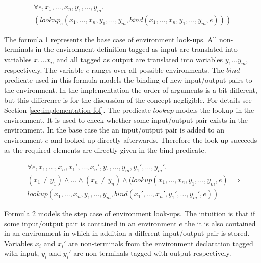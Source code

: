 \begin{figure}
\label{formula:environment-base}
\begin{multline}
  \forall e, x_1, \dots, x_n, y_1, \dots, y_m . \\
  (lookup_e(x_1,\dots,x_n,y_1,\dots,y_m,
  bind(x_1,\dots,x_n,y_1,\dots,y_m,e)))
\end{multline}
\end{figure}

The formula \ref{formula:environment-base} represents the base case of
environment look-ups. All non-terminals in the environment definition
tagged as input are translated into variables $x_1 \dots x_n$ and all
tagged as output are translated into variables $y_1 \dots y_m$,
respectively. The variable $e$ ranges over all possible
environments. The $bind$ predicate used in this formula models the
binding of new input/output pairs to the environment. In the
implementation the order of arguments is a bit different, but this
difference is for the discussion of the concept negligible. For
details see Section \ref{sec:implementation-fof}. The predicate
$lookup$ models the lookup in the environment. It is used to check
whether some input/output pair exists in the environment. In the base
case the an input/output pair is added to an environment $e$ and
looked-up directly afterwards. Therefore the look-up succeeds as the
required elements are directly given in the bind predicate.

\begin{figure}
\label{formula:environment-step}
\begin{multline}
  \forall e, x_1, \dots, x_n, x_1', \dots, x_n', y_1, \dots, y_m,
  y_1', \dots,
  y_m' . \\
  (x_1 \neq y_1) \land \dots \land (x_n \neq y_n) \land (lookup(x_1,
  \dots, x_n, y_1, \dots, y_m, e) \implies \\ lookup(x_1, \dots, x_n,
  y_1, \dots, y_m, bind(x_1',\dots,x_n',y_1',\dots,y_m',e))
\end{multline}
\end{figure}

Formula \ref{formula:environment-step} models the step case of
environment look-ups. The intuition is that if some input/output pair
is contained in an environment $e$ the it is also contained in an
environment in which in addition a different input/output pair is
stored. Variables $x_i$ and $x_i'$ are non-terminals from the
environment declaration tagged with input, $y_i$ and $y_i'$ are
non-terminals tagged with output respectively.

